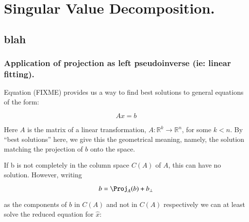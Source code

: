 \chapter{Singular Value Decomposition.}
\label{chap:mpInverseSvdRoughNotes}
\date{ May 15, 2008.  $RCSfile: mpInverseSvdRoughNotes.tex,v $ Last $Revision: 1.1 $ $Date: 2009/10/21 23:43:40 $ }

\section{blah}

\subsection{Application of projection as left pseudoinverse (ie: linear fitting). }


%



Equation (FIXME)
provides us a way to find best solutions to general equations of the form:


\[
A x = b
\]

Here $A$ is the matrix of a linear transformation, $A : \mathbb{R}^k \rightarrow \mathbb{R}^n$, for some $k<n$.
By ``best solutions'' here, we give this the geometrical meaning, namely, the solution matching the projection of $b$ onto the space.

If b is not completely in the column space $C(A)$ of $A$, this can have no solution.  However, writing

\[
b = \Proj_A(b) + b_\perp
\]

as the components of $b$ in $C(A)$ and not in $C(A)$ respectively we can at least solve the reduced equation for $\hat{x}$:


